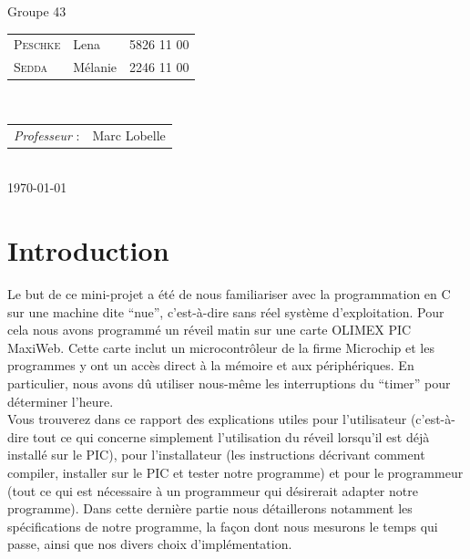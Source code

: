\documentclass[12pt,a4paper]{article}
\begin{document}
\begin{titlepage}

\large
\begin{centering}
Groupe 43\\
\end{centering}
{\begin{tabular}{lll}
\textsc{Peschke} & Lena & 5826 11 00\\
\textsc{Sedda} & Mélanie & 2246 11 00\\
\end{tabular}}
\\[1cm]

\normalsize
{\begin{tabular}{ll}
\textit{Professeur} : & Marc Lobelle \\
\end{tabular}}
\\[1cm]


{\normalsize \today} %

\newpage

\end{titlepage}


\clearpage
\thispagestyle{empty}
\tableofcontents
\clearpage
{}


\section{Introduction}

Le but de ce mini-projet a été de nous familiariser avec la programmation en C sur une machine dite ``nue'', c'est-à-dire sans réel système d'exploitation. Pour cela nous avons programmé un réveil matin sur une carte OLIMEX PIC MaxiWeb. Cette carte inclut un microcontrôleur de la firme Microchip et les programmes y ont un accès direct à la mémoire et aux périphériques. En particulier, nous avons dû utiliser nous-même les interruptions du ``timer'' pour déterminer l'heure.\\

Vous trouverez dans ce rapport des explications utiles pour l'utilisateur (c'est-à-dire tout ce qui concerne simplement l'utilisation du réveil lorsqu'il est déjà installé sur le PIC), pour l'installateur (les instructions décrivant comment compiler, installer sur le PIC et tester notre programme) et pour le programmeur (tout ce qui est nécessaire à un programmeur qui désirerait adapter notre programme). Dans cette dernière partie nous détaillerons notamment les spécifications de notre programme, la façon dont nous mesurons le temps qui passe, ainsi que nos divers choix d'implémentation.
\end{document}

